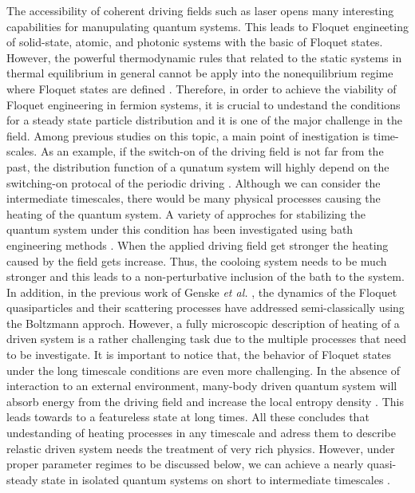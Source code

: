 \documentclass{article}
\begin{document}
The accessibility of coherent driving fields such as laser opens many interesting capabilities for manupulating quantum systems. This leads to Floquet engineeting of solid-state, atomic, and photonic systems with the basic of Floquet states. However, the powerful thermodynamic rules that related to the static systems in thermal equilibrium in general cannot be apply into the nonequilibrium regime where Floquet states are defined \cite{seetharam2015}. Therefore, in order to achieve the viability of Floquet engineering in fermion systems, it is crucial to undestand the conditions for a steady state particle distribution and it is one of the major challenge in the field. Among previous studies on this topic, a main point of inestigation is time-scales. As an example, if the switch-on of the driving field is not far from the past, the distribution function of a qunatum system will highly depend on the switching-on protocal of the periodic driving \cite{dehghani2014}. Although we can consider the intermediate timescales, there would be many physical processes causing the heating of the quantum system. A variety of approches for stabilizing the quantum system under this condition has been investigated using bath engineering methods \cite{seetharam2015,weidinger2017,seetharam2019,rudner2020}. When the applied driving field get stronger the heating caused by the field gets increase. Thus, the cooloing system needs to be much stronger and this leads to a non-perturbative inclusion of the bath to the system. In addition, in the previous work of Genske \textit{et al.} \cite{genske2015}, the dynamics of the Floquet quasiparticles and their scattering processes have addressed semi-classically using the Boltzmann approch. However, a fully microscopic description of heating of a driven system is a rather challenging task due to the multiple processes that need to be investigate.
It is important to notice that, the behavior of Floquet states under the long timescale conditions are even more challenging. In the absence of interaction to an external environment, many-body driven quantum system will absorb energy from the driving field and increase the local entropy density \cite{rudner2020}. This leads towards to a featureless state at long times. All these concludes that undestanding of heating processes in any timescale and adress them to describe relastic driven system needs the treatment of very rich physics. However, under proper parameter regimes to be discussed below, we can achieve a nearly quasi-steady state in isolated quantum systems on short to intermediate timescales \cite{lindner2017,bukov2015,eckardt2015,kuwahara2016,abanin2017,mori2018,rudner2020}.
\end{document}
